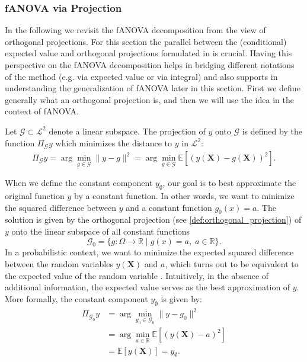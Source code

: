 \subsubsection{fANOVA via Projection}
In the following we revisit the fANOVA decomposition from the view of orthogonal projections.
For this section the parallel between the (conditional) expected value and orthogonal projections formulated in \cite{Vaart_1998} is crucial.
Having this perspective on the fANOVA decomposition helps in bridging different notations of the method (e.g. via expected value or via integral) and also supports in understanding the generalization of fANOVA later in this section. First we define generally what an orthogonal projection is, and then we will use the idea in the context of fANOVA.\par

\begin{definition}\label{def:orthogonal_projection}
    Let $\mathcal{G} \subset \mathcal{L}^2$ denote a linear subspace. The projection of $y$ onto $\mathcal{G}$ is defined by the function $\Pi_{\mathcal{G}}y$ which minimizes the distance to $y$ in $\mathcal{L}^2$:
\begin{align}
    \Pi_{\mathcal{G}}y = \arg\min_{g \in \mathcal{G}} \|y - g\|^2
= \arg\min_{g \in \mathcal{G}} \mathbb{E}[(y(\boldsymbol{X}) - g(\boldsymbol{X}))^2].
\end{align}
\end{definition}

When we define the constant component $y_\emptyset$, our goal is to best 
approximate the original function $y$ by a constant function. 
In other words, we want to minimize the squared difference between $y$ and 
a constant function $g_0(x) = a$. 
The solution is given by the orthogonal projection (see \autoref{def:orthogonal_projection}) 
of $y$ onto the linear subspace of all constant functions 
$$\mathcal{G}_0 = \{ g : \Omega \to \mathbb{R} \mid g(x) = a,\; a \in \mathbb{R} \}.$$
In a probabilistic context, we want to minimize the expected squared difference 
between the random variables $y(\boldsymbol{X})$ and $a$, which turns out to be 
equivalent to the expected value of the random variable \citep{Vaart_1998}.
Intuitively, in the absence of additional information, the expected value serves 
as the best approximation of $y$. 
More formally, the constant component $y_{\emptyset}$ is given by:
\begin{align*}
    \Pi_{\mathcal{G}_0}y
    &= \arg \min_{g_0 \in \mathcal{G}_0} \|y - g_0\|^2 \\ 
    &= \arg \min_{a \in \mathbb{R}} \mathbb{E}[(y(\boldsymbol{X}) - a)^2] \\ 
    &= \mathbb{E}[y(\boldsymbol{X})] = y_{\emptyset}.
\end{align*}

